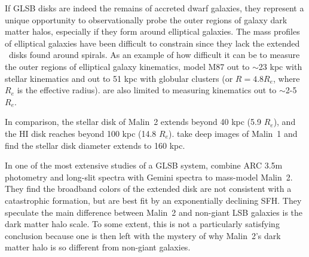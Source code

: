 \documentclass{emulateapj}
\newcommand\HI{\ion{H}{1}}
\begin{document}
If GLSB disks are indeed the remains of accreted dwarf galaxies, they represent a unique opportunity to observationally probe the outer regions of galaxy dark matter halos, especially if they form around elliptical galaxies.  The mass profiles of elliptical galaxies have been difficult to constrain since they lack the extended \HI\ disks found around spirals.  As an example of how difficult it can be to measure the outer regions of elliptical galaxy kinematics, \citet{Murphy2011} model M87 out to $\sim$23 kpc with stellar kinematics and out to 51 kpc with globular clusters (or $R=4.8 R_e$, where $R_e$ is the effective radius). \citet{Raskutti14} are also limited to measuring kinematics out to $\sim$2-5 $R_e$.  

In comparison, the stellar disk of Malin~2 extends beyond 40 kpc (5.9 $R_e$), and the HI disk reaches beyond 100 kpc (14.8 $R_e$).  \citet{Galaz15} take deep images of Malin~1 and find the stellar disk diameter extends to 160 kpc.  








In one of the most extensive studies of a GLSB system, \citet{Kasparova14} combine ARC 3.5m photometry and long-slit spectra with Gemini spectra to mass-model Malin~2.  They find the broadband colors of the extended disk are not consistent with a catastrophic formation, but are best fit by an exponentially declining SFH.  They speculate the main difference between Malin~2 and non-giant LSB galaxies is the dark matter halo scale.  To some extent, this is not a particularly satisfying conclusion because one is then left with the mystery of why Malin~2's dark matter halo is so different from non-giant galaxies.
\end{document}
